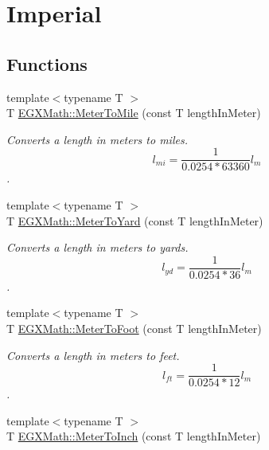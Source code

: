 \hypertarget{group___e_g_x_math-_conversions-_length_conversions-_meter-_imperial}{}\section{Imperial}
\label{group___e_g_x_math-_conversions-_length_conversions-_meter-_imperial}
\subsection*{Functions}
\begin{DoxyCompactItemize}
\item 
{\footnotesize template$<$typename T $>$ }\\T \mbox{\hyperlink{group___e_g_x_math-_conversions-_length_conversions-_meter-_imperial_gad99b2a17c589bee13f354975b326fe74}{E\+G\+X\+Math\+::\+Meter\+To\+Mile}} (const T length\+In\+Meter)
\begin{DoxyCompactList}\small\item\em Converts a length in meters to miles. \[ l_{mi}=\frac{1}{0.0254 * 63360} l_{m} \]. \end{DoxyCompactList}\item 
{\footnotesize template$<$typename T $>$ }\\T \mbox{\hyperlink{group___e_g_x_math-_conversions-_length_conversions-_meter-_imperial_ga958e4dfc661ba34f49bc3aaebe6e30be}{E\+G\+X\+Math\+::\+Meter\+To\+Yard}} (const T length\+In\+Meter)
\begin{DoxyCompactList}\small\item\em Converts a length in meters to yards. \[ l_{yd}= \frac{1}{0.0254 * 36} l_{m} \]. \end{DoxyCompactList}\item 
{\footnotesize template$<$typename T $>$ }\\T \mbox{\hyperlink{group___e_g_x_math-_conversions-_length_conversions-_meter-_imperial_gad5d3d7875ebe02e1a988665271360f34}{E\+G\+X\+Math\+::\+Meter\+To\+Foot}} (const T length\+In\+Meter)
\begin{DoxyCompactList}\small\item\em Converts a length in meters to feet. \[ l_{ft}= \frac{1}{0.0254 * 12} l_{m} \]. \end{DoxyCompactList}\item 
{\footnotesize template$<$typename T $>$ }\\T \mbox{\hyperlink{group___e_g_x_math-_conversions-_length_conversions-_meter-_imperial_gaaf056673bfe97e10a61a527f4b3598ba}{E\+G\+X\+Math\+::\+Meter\+To\+Inch}} (const T length\+In\+Meter)

\end{DoxyCompactItemize}
